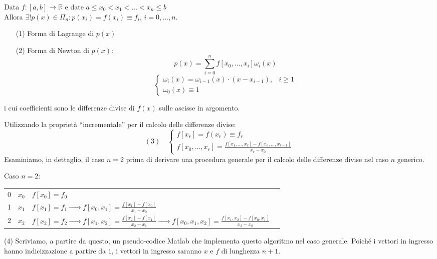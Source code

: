 \vspace{0.5cm}

Data $f:[a,b] \rightarrow \mathbb{R}$ e date $a \le x_0 < x_1 < \dots < x_n \le b$ \\
Allora $\exists! p(x) \in \Pi_n : p(x_i) = f(x_i) \equiv f_i$, $i=0, \dots, n$.

\begin{itemize}
    \item[(1)] Forma di Lagrange di $p(x)$
    \item[(2)] Forma di Newton di $p(x)$:
    $$p(x) = \sum_{i=0}^{n} f[x_0, \dots, x_i] \omega_i(x)$$
    $$\begin{cases}
    \omega_i(x) = \omega_{i-1}(x) \cdot (x-x_{i-1}), & i \ge 1 \\
    \omega_0(x) \equiv 1
    \end{cases}$$
\end{itemize}

i cui coefficienti sono le differenze divise di $f(x)$ sulle ascisse in argomento.

Utilizzando la proprietà ``incrementale'' per il calcolo delle differenze divise:
$$
(3) \quad
\begin{cases} 
f[x_r] = f(x_r) \equiv f_r \\ 
f[x_0, \dots, x_r] = \frac{f[x_1, \dots, x_r] - f[x_0, \dots, x_{r-1}]}{x_r - x_0}
\end{cases}
$$
Esaminiamo, in dettaglio, il caso $n=2$ prima di derivare una procedura generale per il calcolo delle differenze divise nel caso $n$ generico.

Caso $n=2$:
\begin{center}
\renewcommand{\arraystretch}{1.5}
\begin{tabular}{l|lll}
0 & $x_0$ & $f[x_0] = f_0$ & \\
1 & $x_1$ & $f[x_1] = f_1 \xrightarrow{\hspace{1cm}} f[x_0, x_1] = \frac{f[x_1]-f[x_0]}{x_1-x_0}$ & \\
2 & $x_2$ & $f[x_2] = f_2 \xrightarrow{\hspace{1cm}} f[x_1, x_2] = \frac{f[x_2]-f[x_1]}{x_2-x_1} \xrightarrow{\hspace{1cm}} f[x_0, x_1, x_2] = \frac{f[x_1, x_2]-f[x_0, x_1]}{x_2-x_0}$
\end{tabular}
\end{center}

(4) Scriviamo, a partire da questo, un pseudo-codice Matlab che implementa questo algoritmo nel caso generale.
Poiché i vettori in ingresso hanno indicizzazione a partire da $1$, i vettori in ingresso saranno $x$ e $f$ di lunghezza $n+1$.

